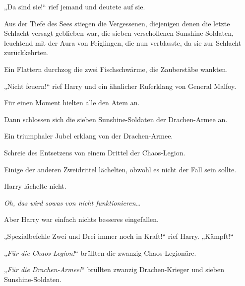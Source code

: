 „Da sind sie!“ rief jemand und deutete auf sie.

Aus der Tiefe des Sees stiegen die Vergessenen, diejenigen denen die letzte Schlacht versagt geblieben war, die sieben verschollenen Sunshine-Soldaten, leuchtend mit der Aura von Feiglingen, die nun verblasste, da sie zur Schlacht zurückkehrten.

Ein Flattern durchzog die zwei Fischschwärme, die Zauberstäbe wankten.

„Nicht feuern!“ rief Harry und ein ähnlicher Ruferklang von General Malfoy.

Für einen Moment hielten alle den Atem an.

Dann schlossen sich die sieben Sunshine-Soldaten der Drachen-Armee an.

Ein triumphaler Jubel erklang von der Drachen-Armee.

Schreie des Entsetzens von einem Drittel der Chaos-Legion.

Einige der anderen Zweidrittel lächelten, obwohl es nicht der Fall sein sollte.

Harry lächelte nicht.

\emph{Oh, das wird sowas von nicht funktionieren…}

Aber Harry war einfach nichts besseres eingefallen.

„Spezialbefehle Zwei und Drei immer noch in Kraft!“ rief Harry. „Kämpft!“

„\emph{Für die Chaos-Legion!}“ brüllten die zwanzig Chaos-Legionäre.

„\emph{Für die Drachen-Armee!}“ brüllten zwanzig Drachen-Krieger und sieben Sunshine-Soldaten.

